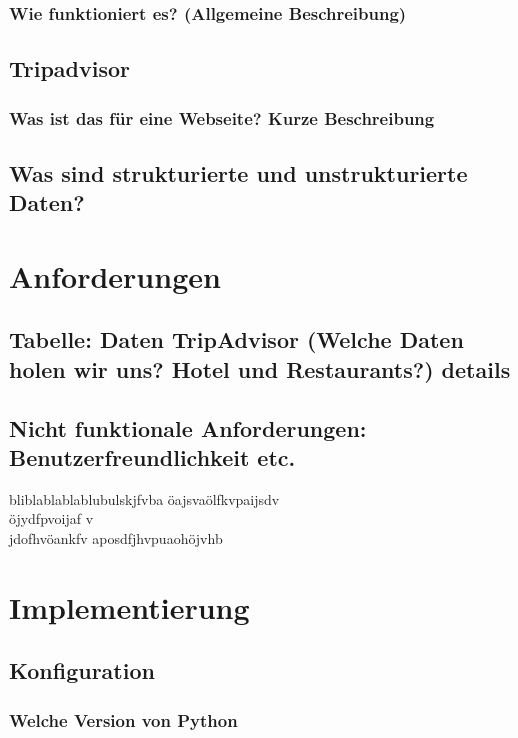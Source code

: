 \documentclass[a4paper,oneside,12pt]{report}
\begin{document}
			\subsection{Wie funktioniert es? (Allgemeine Beschreibung)}
		
		\section{Tripadvisor}
		
			\subsection{Was ist das für eine Webseite? Kurze Beschreibung}
			
		\section{Was sind strukturierte und unstrukturierte Daten?}
	
	
	

	\chapter{Anforderungen}	
	
		\section{Tabelle: Daten TripAdvisor (Welche Daten holen wir uns? Hotel und Restaurants?) details}
		
		\section{Nicht funktionale Anforderungen: Benutzerfreundlichkeit etc.}
			bliblablablablubulskjfvba
			öajsvaölfkvpaijsdv
			\\
			öjydfpvoijaf
			v\\jdofhvöankfv
			aposdfjhvpuaohöjvhb
			
			
			
			
	\chapter{Implementierung}
	
		\section{Konfiguration}
		
			\subsection{Welche Version von Python}
			
\end{document}
